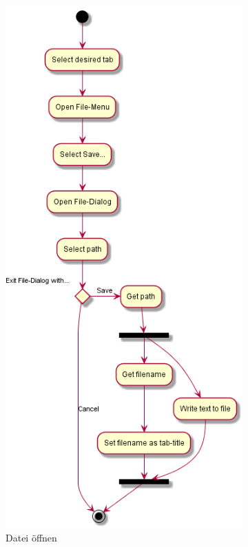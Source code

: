 \begin{figure}[H]
    \begin{subfigure}[b]{0.45\linewidth}
        
        \includegraphics[width=\linewidth]{figures/save/save.png}
        \caption{Datei öffnen}
    \end{subfigure}
    \begin{subfigure}[b]{0.45\linewidth}
        

\end{subfigure}
\end{figure}

